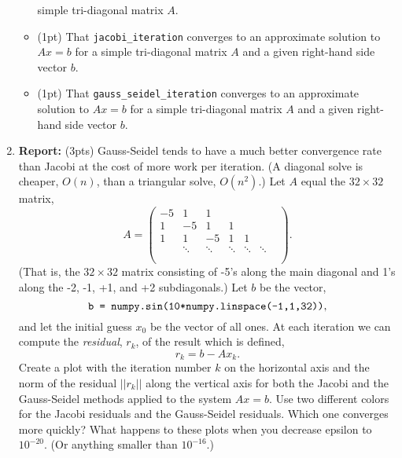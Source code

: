 \documentclass[12pt]{article}
\begin{document}
\begin{enumerate}
\begin{itemize}
    simple tri-diagonal matrix $A$.
  \item (1pt) That {\tt jacobi\_iteration} converges to an approximate solution
    to $Ax = b$ for a simple tri-diagonal matrix $A$ and a given right-hand side
    vector $b$.
  \item (1pt) That {\tt gauss\_seidel\_iteration} converges to an approximate
    solution to $Ax = b$ for a simple tri-diagonal matrix $A$ and a given
    right-hand side vector $b$.
  \end{itemize}
\item {\bf Report:} (3pts) Gauss-Seidel tends to have a much better convergence
  rate than Jacobi at the cost of more work per iteration. (A diagonal solve is
  cheaper, $O(n)$, than a triangular solve, $O(n^2)$.) Let $A$ equal the $32
  \times 32$ matrix,
  \[
    A = 
    \begin{pmatrix}
      -5 & 1     & 1      &        &        & \\
      1 & -5     & 1      & 1      &        & \\
      1 & 1      & -5     & 1      & 1      & \\
        & \ddots & \ddots & \ddots & \ddots & \ddots \\
        & & & & & & \\
        & & & & & &
    \end{pmatrix}.
  \]
  (That is, the $32 \times 32$ matrix consisting of -5's along the main diagonal
  and 1's along the -2, -1, +1, and +2 subdiagonals.) Let $b$ be the vector,
  \[
    \text{\tt b = numpy.sin(10*numpy.linspace(-1,1,32))},
  \]
  and let the initial guess $x_0$ be the vector of all ones. At each iteration
  we can compute the {\it residual}, $r_k$, of the result which is defined,
  \[
    r_k = b - Ax_k.
  \]
  Create a plot with the iteration number $k$ on the horizontal axis and the
  norm of the residual $||r_k||$ along the vertical axis for both the Jacobi and
  the Gauss-Seidel methods applied to the system $Ax = b$. Use two different
  colors for the Jacobi residuals and the Gauss-Seidel residuals. Which one
  converges more quickly? What happens to these plots when you decrease epsilon
  to $10^{-20}$. (Or anything smaller than $10^{-16}$.)
\end{enumerate}


\end{document}
